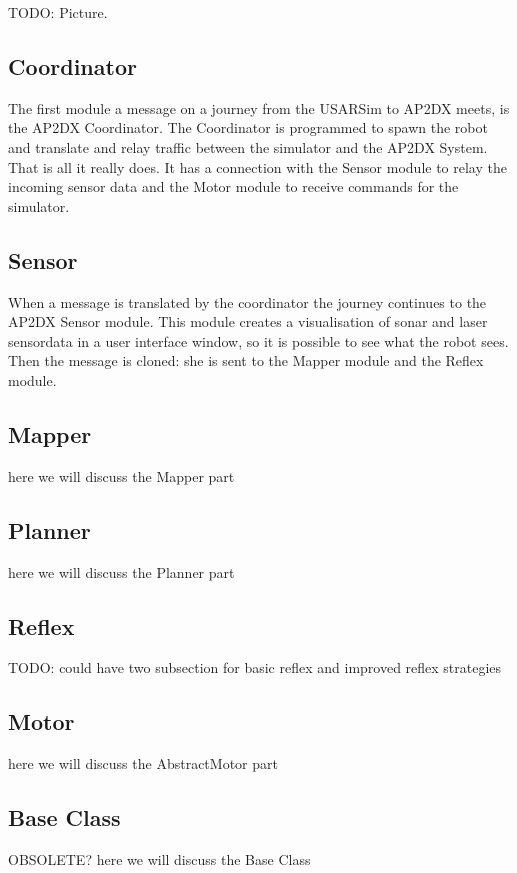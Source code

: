 \documentclass[a4paper,10pt]{article}
\begin{document}
TODO: Picture.

\subsection{Coordinator}
The first module a message on a journey from the USARSim to AP2DX meets, is the AP2DX Coordinator. The Coordinator is programmed to spawn the robot and translate and relay traffic between the simulator and the AP2DX System. That is all it really does. It has a connection with the Sensor module to relay the incoming sensor data and the Motor module to receive commands for the simulator.

\subsection{Sensor}
When a message is translated by the coordinator the journey continues to the AP2DX Sensor module. This module creates a visualisation of sonar and laser sensordata in a user interface window, so it is possible to see what the robot sees. Then the message is cloned: she is sent to the Mapper module and the Reflex module.

\subsection{Mapper}
here we will discuss the Mapper part

\subsection{Planner}
here we will discuss the Planner part

\subsection{Reflex}

TODO: could have two subsection for basic reflex and improved reflex strategies

\subsection{Motor}
here we will discuss the AbstractMotor part

\subsection{Base Class}
OBSOLETE? here we will discuss the Base Class
\end{document}
